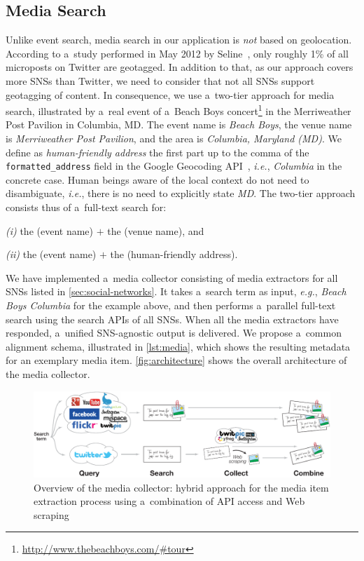 \documentclass{acm_proc_article-sp}
\let\oldemph\emph
\renewcommand{\emph}[1]{\oldemph{\fontsize{9}{9}\selectfont #1}}
\begin{document}
\subsection{Media Search} \label{sec:media-search}
Unlike event search, media search in our application is \emph{not} based on geolocation.
According to a~study performed in May 2012 by Seline~\cite{Quora2012},
only roughly 1\% of all microposts on Twitter are geotagged.
In addition to that, as our approach covers more SNSs than Twitter,
we need to consider that not all SNSs support geotagging of content.
In consequence, we use a~two-tier approach for media search,
illustrated by a~real event of a~Beach Boys
concert\footnote{\url{http://www.thebeachboys.com/\#tour}}
in the Merriweather Post Pavilion in Columbia, MD.
The event name is \emph{Beach Boys},
the venue name is \emph{Merriweather Post Pavilion},
and the area is \emph{Columbia, Maryland (MD)}.
We define as \emph{human-friendly address}
the first part up to the comma of the \texttt{formatted\_address} field
in the Google Geocoding API~\cite{Geocoding2012},
\emph{i.e.}, \emph{Columbia} in the concrete case.
Human beings aware of the local context do not need to disambiguate, \emph{i.e.},
there is no need to explicitly state \emph{MD}.
The two-tier approach consists thus of a~full-text search for:

\emph{(i)} the (event name) $+$ the (venue name), and

\emph{(ii)} the (event name) $+$ the (human-friendly address).

We have implemented a~media collector consisting of media extractors for all SNSs
listed in \autoref{sec:social-networks}.
It takes a~search term as input, \emph{e.g.},
\emph{Beach Boys Columbia} for the example above,
and then performs a~parallel full-text search using the search APIs of all SNSs.
When all the media extractors have responded, a~unified SNS-agnostic output is delivered.
We propose a~common alignment schema, illustrated in
\autoref{lst:media}, which shows the resulting metadata for an exemplary media item.
\autoref{fig:architecture} shows the overall architecture of the media collector.

\begin{figure}[bh!]
\centering
\includegraphics[width=0.8\linewidth]{./architecture.pdf}
\caption{Overview of the media collector: hybrid approach for the media item extraction process using a~combination of API access and Web scraping}
\label{fig:architecture}
\end{figure}
\end{document}
